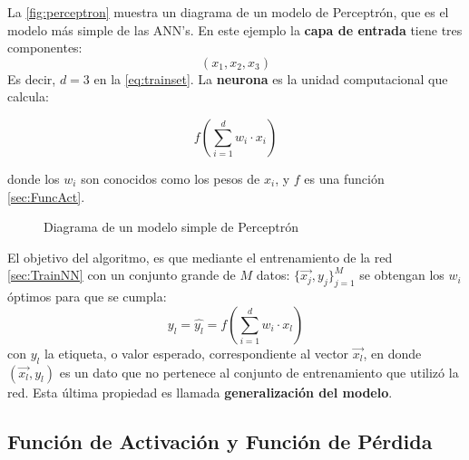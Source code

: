 La \autoref{fig:perceptron} muestra un diagrama de un modelo de Perceptrón, que es el modelo más simple de las ANN's. En este ejemplo la \textbf{capa de entrada} tiene tres componentes:
$$(x_1,x_2,x_3)$$
Es decir, $d=3$ en la \autoref{eq:trainset}. La \textbf{neurona} es la unidad computacional que calcula:

\begin{equation}
  \label{eq:neuronfun}
  f\left( \sum_{i=1}^dw_i\cdot x_i \right)
\end{equation}

donde los $w_i$ son conocidos como los pesos de $x_i$, y $f$ es una función \autoref{sec:FuncAct}.
\begin{figure}[hb]
  \centering

\caption{Diagrama de un modelo simple de Perceptrón}
\label{fig:perceptron}
\end{figure}

El objetivo del algoritmo, es que mediante el entrenamiento de la red \autoref{sec:TrainNN} con un conjunto grande de $M$ datos: $\{\vec{x_j},y_j\}_{j=1}^{M}$ se obtengan los $w_i$ óptimos para que se cumpla:
$$y_l= \hat{y_l} = f\left( \sum_{i=1}^dw_i\cdot x_l \right)$$
con $y_l$ la etiqueta, o valor esperado, correspondiente al vector $\vec{x_l}$, en donde $(\vec{x_l},y_l)$ es un dato que no pertenece al conjunto de entrenamiento que utilizó la red. Esta última propiedad es llamada \textbf{generalización del modelo}.

\subsection{Función de Activación y Función de Pérdida}\label{sec:FuncAct}

